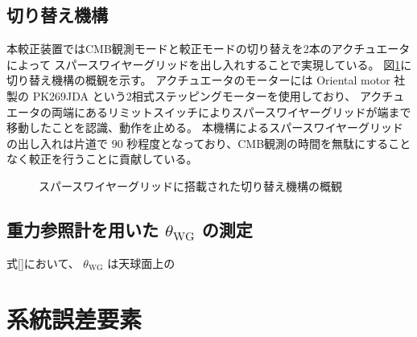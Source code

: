 \documentclass[../../main.tex]{subfiles}
\begin{document}
\subsection{切り替え機構}
本較正装置ではCMB観測モードと較正モードの切り替えを2本のアクチュエータによって
スパースワイヤーグリッドを出し入れすることで実現している。
図\ref{}に切り替え機構の概観を示す。
アクチュエータのモーターには Oriental motor 社製の PK269JDA という2相式ステッピングモーターを使用しており、
アクチュエータの両端にあるリミットスイッチによりスパースワイヤーグリッドが端まで移動したことを認識、動作を止める。
本機構によるスパースワイヤーグリッドの出し入れは片道で $90$ 秒程度となっており、CMB観測の時間を無駄にすることなく較正を行うことに貢献している\cite{swg:nakata}。
\begin{figure}
    \centering
    \caption[スパースワイヤーグリッドに搭載された切り替え機構の概観]{スパースワイヤーグリッドに搭載された切り替え機構の概観}
    \label{fig:gridloader}
\end{figure}
\subsection{重力参照計を用いた $\theta_{\mathrm{WG}}$ の測定}
式\eqref{}において、 $\theta_{\mathrm{WG}}$ は天球面上の


\section{系統誤差要素}
\end{document}
